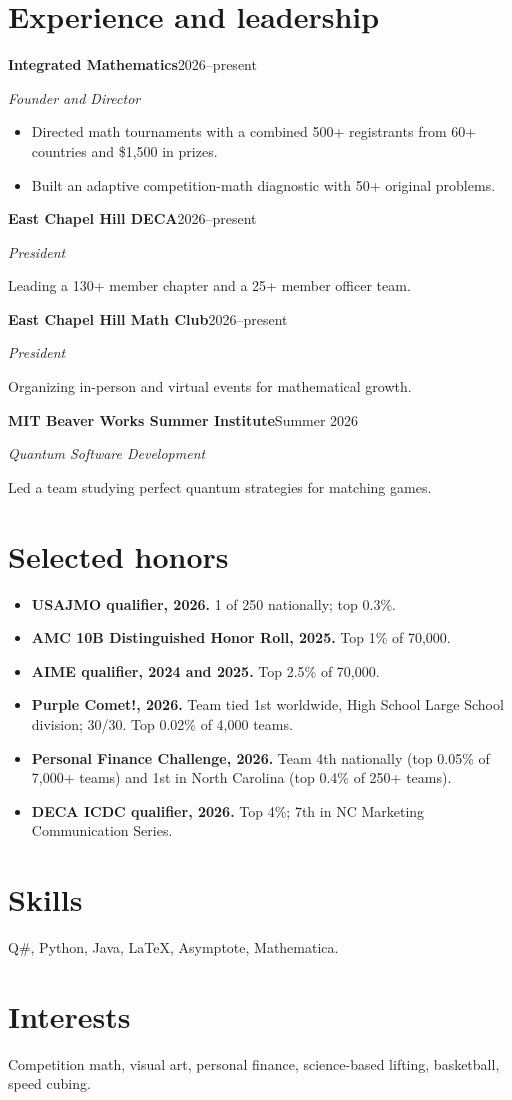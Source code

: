 \documentclass[10pt,letterpaper]{article}
\begin{document}
\section*{Experience and leadership}
\textbf{Integrated Mathematics}\hfill {\small 2026--present}\par
\textit{Founder and Director}\par
\begin{itemize}
\item Directed math tournaments with a combined 500+ registrants from 60+ countries and \$1,500 in prizes.
\item Built an adaptive competition-math diagnostic with 50+ original problems.
\end{itemize}
\vspace{3pt}
\textbf{East Chapel Hill DECA}\hfill {\small 2026--present}\par
\textit{President}\par
Leading a 130+ member chapter and a 25+ member officer team.\par
\vspace{3pt}
\textbf{East Chapel Hill Math Club}\hfill {\small 2026--present}\par
\textit{President}\par
Organizing in-person and virtual events for mathematical growth.\par
\vspace{3pt}
\textbf{MIT Beaver Works Summer Institute}\hfill {\small Summer 2026}\par
\textit{Quantum Software Development}\par
Led a team studying perfect quantum strategies for matching games.\par
\vspace{3pt}
\section*{Selected honors}
\begin{itemize}
\item \textbf{USAJMO qualifier, 2026.} 1 of 250 nationally; top 0.3\%.
\item \textbf{AMC 10B Distinguished Honor Roll, 2025.} Top 1\% of 70,000.
\item \textbf{AIME qualifier, 2024 and 2025.} Top 2.5\% of 70,000.
\item \textbf{Purple Comet!, 2026.} Team tied 1st worldwide, High School Large School division; 30/30. Top 0.02\% of 4,000 teams.
\item \textbf{Personal Finance Challenge, 2026.} Team 4th nationally (top 0.05\% of 7,000+ teams) and 1st in North Carolina (top 0.4\% of 250+ teams).
\item \textbf{DECA ICDC qualifier, 2026.} Top 4\%; 7th in NC Marketing Communication Series.
\end{itemize}
\section*{Skills}
Q\#, Python, Java, LaTeX, Asymptote, Mathematica.\par
\section*{Interests}
Competition math, visual art, personal finance, science-based lifting, basketball, speed cubing.\par
\end{document}
